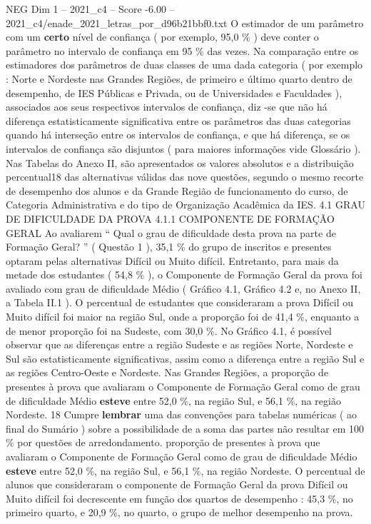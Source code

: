 \begin{textsample}{NEG Dim 1 – 2021\_c4 – Score -6.00 – 2021\_c4/enade\_2021\_letras\_por\_d96b21bbf0.txt}
O estimador de um parâmetro com um \textbf{certo} nível de confiança ( por exemplo, 95,0 \% ) deve conter o parâmetro no intervalo de confiança em 95 \% das vezes.
Na comparação entre os estimadores dos parâmetros de duas classes de uma dada categoria ( por exemplo : Norte e Nordeste nas Grandes Regiões, de primeiro e último quarto dentro de desempenho, de IES Públicas e Privada, ou de Universidades e Faculdades ), associados aos seus respectivos intervalos de confiança, diz -se que não há diferença estatisticamente significativa entre os parâmetros das duas categorias quando há interseção entre os intervalos de confiança, e que há diferença, se os intervalos de confiança são disjuntos ( para maiores informações vide Glossário ).
Nas Tabelas do Anexo II, são apresentados os valores absolutos e a distribuição percentual18 das alternativas válidas das nove questões, segundo o mesmo recorte de desempenho dos alunos e da Grande Região de funcionamento do curso, de Categoria Administrativa e do tipo de Organização Acadêmica da IES. 4.1 GRAU DE DIFICULDADE DA PROVA 4.1.1 COMPONENTE DE FORMAÇÃO GERAL Ao avaliarem “ Qual o grau de dificuldade desta prova na parte de Formação Geral? ” ( Questão 1 ), 35,1 \% do grupo de inscritos e presentes optaram pelas alternativas Difícil ou Muito difícil.
Entretanto, para mais da metade dos estudantes ( 54,8 \% ), o Componente de Formação Geral da prova foi avaliado com grau de dificuldade Médio ( Gráfico 4.1, Gráfico 4.2 e, no Anexo II, a Tabela II.1 ).
O percentual de estudantes que consideraram a prova Difícil ou Muito difícil foi maior na região Sul, onde a proporção foi de 41,4 \%, enquanto a de menor proporção foi na Sudeste, com 30,0 \%.
No Gráfico 4.1, é possível observar que as diferenças entre a região Sudeste e as regiões Norte, Nordeste e Sul são estatisticamente significativas, assim como a diferença entre a região Sul e as regiões Centro-Oeste e Nordeste.
Nas Grandes Regiões, a proporção de presentes à prova que avaliaram o Componente de Formação Geral como de grau de dificuldade Médio \textbf{esteve} entre 52,0 \%, na região Sul, e 56,1 \%, na região Nordeste. 18 Cumpre \textbf{lembrar} uma das convenções para tabelas numéricas ( ao final do Sumário ) sobre a possibilidade de a soma das partes não resultar em 100 \% por questões de arredondamento. proporção de presentes à prova que avaliaram o Componente de Formação Geral como de grau de dificuldade Médio \textbf{esteve} entre 52,0 \%, na região Sul, e 56,1 \%, na região Nordeste.
O percentual de alunos que consideraram o componente de Formação Geral da prova Difícil ou Muito difícil foi decrescente em função dos quartos de desempenho : 45,3 \%, no primeiro quarto, e 20,9 \%, no quarto, o grupo de melhor desempenho na prova.

\end{textsample}
